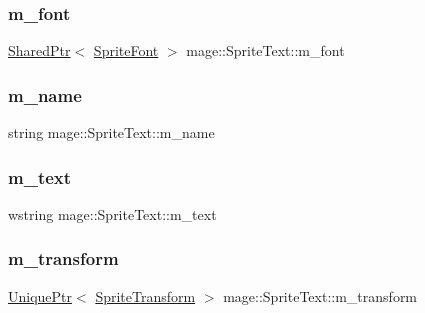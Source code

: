 \hypertarget{classmage_1_1_sprite_text_a922e37fbcbc431e815ebabe82e4528b0}{}\label{classmage_1_1_sprite_text_a922e37fbcbc431e815ebabe82e4528b0} 
\subsubsection{\texorpdfstring{m\+\_\+font}{m\_font}}
{\footnotesize\ttfamily \hyperlink{namespacemage_a1e01ae66713838a7a67d30e44c67703e}{Shared\+Ptr}$<$ \hyperlink{classmage_1_1_sprite_font}{Sprite\+Font} $>$ mage\+::\+Sprite\+Text\+::m\+\_\+font\hspace{0.3cm}{\ttfamily [private]}}

\hypertarget{classmage_1_1_sprite_text_a2c4cde370b6785d970c2d3ef127dda87}{}\label{classmage_1_1_sprite_text_a2c4cde370b6785d970c2d3ef127dda87} 
\subsubsection{\texorpdfstring{m\+\_\+name}{m\_name}}
{\footnotesize\ttfamily string mage\+::\+Sprite\+Text\+::m\+\_\+name\hspace{0.3cm}{\ttfamily [private]}}

\hypertarget{classmage_1_1_sprite_text_a807d5dc467ef16f6c83762dfe6ad3391}{}\label{classmage_1_1_sprite_text_a807d5dc467ef16f6c83762dfe6ad3391} 
\subsubsection{\texorpdfstring{m\+\_\+text}{m\_text}}
{\footnotesize\ttfamily wstring mage\+::\+Sprite\+Text\+::m\+\_\+text\hspace{0.3cm}{\ttfamily [private]}}

\hypertarget{classmage_1_1_sprite_text_a2b8441454a3811e6a1869d999c4d2063}{}\label{classmage_1_1_sprite_text_a2b8441454a3811e6a1869d999c4d2063} 
\subsubsection{\texorpdfstring{m\+\_\+transform}{m\_transform}}
{\footnotesize\ttfamily \hyperlink{namespacemage_a8c307fbcc33bce9b7f2aa4c26c3b95cf}{Unique\+Ptr}$<$ \hyperlink{structmage_1_1_sprite_transform}{Sprite\+Transform} $>$ mage\+::\+Sprite\+Text\+::m\+\_\+transform\hspace{0.3cm}{\ttfamily [private]}}

